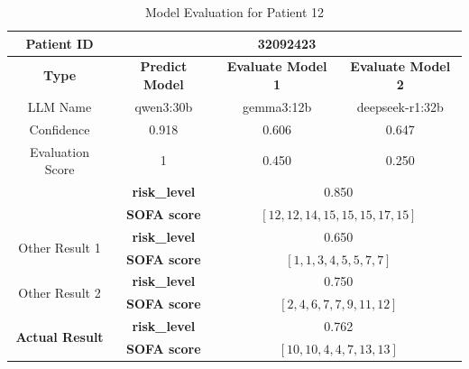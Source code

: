 \begin{table}[htbp]
 \centering
 \caption{Model Evaluation for Patient 12}
 \label{tab:patient12}
 \begin{tabular}{cccc}
 \toprule
 \textbf{ Patient ID } & \multicolumn{3}{c}{32092423} \\
 \midrule
 \textbf{ Type } & \textbf{ Predict Model } & \textbf{ Evaluate Model 1 } & \textbf{ Evaluate Model 2 } \\
 LLM Name & qwen3:30b & gemma3:12b & deepseek-r1:32b \\
 Confidence & 0.918 & 0.606 & 0.647 \\
 Evaluation Score & 1 & 0.450 & 0.250 \\
 \midrule
 \addlinespace
 \multirow{2}{*}{\textbf{ Best Result }} & \textbf{ risk\_level } & \multicolumn{2}{c}{0.850} \\
      & \textbf{ SOFA score } & \multicolumn{2}{c}{$[12, 12, 14, 15, 15, 15, 17, 15]$} \\
 \midrule
 \multirow{2}{*}{Other Result 1} & \textbf{ risk\_level } & \multicolumn{2}{c}{0.650} \\
      & \textbf{ SOFA score } & \multicolumn{2}{c}{$[1, 1, 3, 4, 5, 5, 7, 7]$} \\
 \midrule
 \multirow{2}{*}{Other Result 2} & \textbf{ risk\_level } & \multicolumn{2}{c}{0.750} \\
      & \textbf{ SOFA score } & \multicolumn{2}{c}{$[2, 4, 6, 7, 7, 9, 11, 12]$} \\
 \midrule
 \multirow{2}{*}{\textbf{ Actual Result }} & \textbf{ risk\_level } & \multicolumn{2}{c}{0.762} \\
      & \textbf{ SOFA score } & \multicolumn{2}{c}{$[10, 10, 4, 4, 7, 13, 13]$} \\
 \bottomrule
 \end{tabular}
\end{table}

